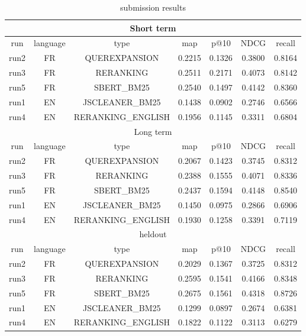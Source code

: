 \begin{table}[h!]
    \centering
    \begin{tabular}{ |c|c|c|c|c|c|c| }

        \hline
        \hline
        \multicolumn{7}{|c|}{Short term} \\ \hline
        run & language & type & map & p@10 & NDCG & recall \\ \hline
        run2 &   FR   & QUEREXPANSION & 0.2215 & 0.1326 & 0.3800 & 0.8164 \\ \hline
        run3 &   FR   & RERANKING & 0.2511 & 0.2171 & 0.4073 & 0.8142 \\ \hline
        run5 &   FR   & SBERT\_BM25 & 0.2540 & 0.1497 & 0.4142 & 0.8360 \\ \hline
        run1 &   EN   & JSCLEANER\_BM25 & 0.1438 & 0.0902 & 0.2746 & 0.6566 \\ \hline
        run4 &   EN   & RERANKING\_ENGLISH & 0.1956 & 0.1145 & 0.3311 & 0.6804 \\ \hline
        \hline

        \multicolumn{7}{|c|}{Long term} \\ \hline
        run  & language & type & map & p@10 & NDCG & recall \\ \hline
        run2 &   FR   & QUEREXPANSION & 0.2067 & 0.1423 & 0.3745 & 0.8312 \\ \hline
        run3 &   FR   & RERANKING & 0.2388 & 0.1555 & 0.4071 & 0.8336 \\ \hline
        run5 &   FR   & SBERT\_BM25 & 0.2437 & 0.1594 & 0.4148 & 0.8540 \\ \hline
        run1 &   EN   & JSCLEANER\_BM25  & 0.1450 & 0.0975 & 0.2866 & 0.6906 \\ \hline
        run4 &   EN   & RERANKING\_ENGLISH & 0.1930 & 0.1258 & 0.3391 & 0.7119 \\ \hline
        \hline

        \multicolumn{7}{|c|}{heldout} \\ \hline
        run  & language & type & map & p@10 & NDCG & recall \\ \hline
        run2 &   FR   & QUEREXPANSION & 0.2029 & 0.1367 & 0.3725 & 0.8312 \\ \hline
        run3 &   FR   & RERANKING & 0.2595 & 0.1541 & 0.4166 & 0.8348 \\ \hline
        run5 &   FR   & SBERT\_BM25 & 0.2675 & 0.1561 & 0.4318 & 0.8726 \\ \hline
        run1 &   EN   & JSCLEANER\_BM25 & 0.1299 & 0.0897 & 0.2674 & 0.6381 \\ \hline
        run4 &   EN   & RERANKING\_ENGLISH & 0.1822 & 0.1122 & 0.3113 & 0.6279 \\ \hline
        

    \end{tabular}
    \caption{submission results}
    \label{table:results\_submission}
\end{table}